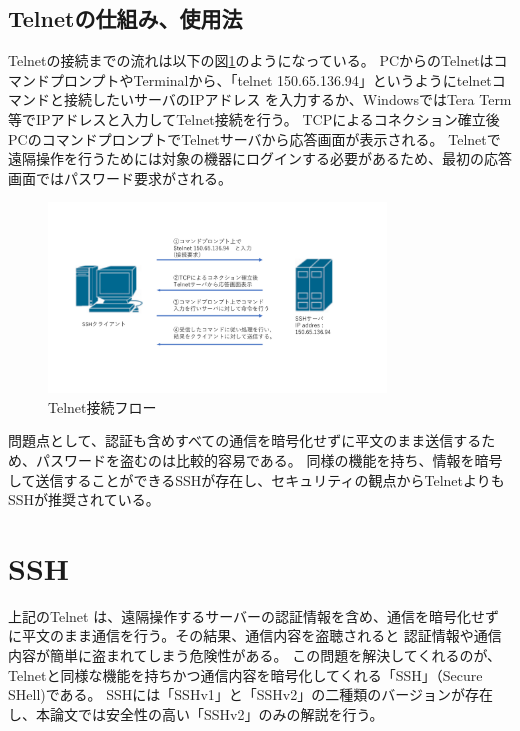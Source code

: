 \documentclass[12pt,a4paper,titlepage]{jreport}
\begin{document}
\subsection{Telnetの仕組み、使用法}
Telnetの接続までの流れは以下の図\ref{telnet_flow}のようになっている。
PCからのTelnetはコマンドプロンプトやTerminalから、「telnet 150.65.136.94」というようにtelnetコマンドと接続したいサーバのIPアドレス
を入力するか、WindowsではTera Term等でIPアドレスと入力してTelnet接続を行う。
TCPによるコネクション確立後PCのコマンドプロンプトでTelnetサーバから応答画面が表示される。
Telnetで遠隔操作を行うためには対象の機器にログインする必要があるため、最初の応答画面ではパスワード要求がされる。

\begin{figure}[H]
    \centering
    \includegraphics*[width=0.8\textwidth,page=1]{graphs/network_archtecture.pdf}
    \caption{Telnet接続フロー}
    \label{telnet_flow}
\end{figure}

問題点として、認証も含めすべての通信を暗号化せずに平文のまま送信するため、パスワードを盗むのは比較的容易である。
同様の機能を持ち、情報を暗号して送信することができるSSHが存在し、セキュリティの観点からTelnetよりもSSHが推奨されている。

\section{SSH}
上記のTelnet は、遠隔操作するサーバーの認証情報を含め、通信を暗号化せずに平文のまま通信を行う。その結果、通信内容を盗聴されると
認証情報や通信内容が簡単に盗まれてしまう危険性がある。
この問題を解決してくれるのが、Telnetと同様な機能を持ちかつ通信内容を暗号化してくれる「SSH」（Secure SHell)である。
SSHには「SSHv1」と「SSHv2」の二種類のバージョンが存在し、本論文では安全性の高い「SSHv2」のみの解説を行う。
\end{document}
